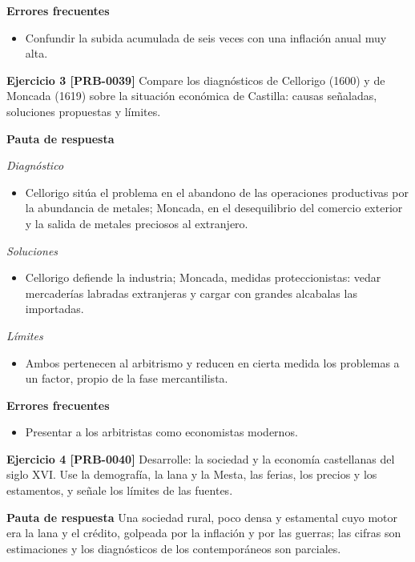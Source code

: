 \documentclass{book}
\begin{document}
\noindent\textbf{Errores frecuentes}
\begin{itemize}
\item Confundir la subida acumulada de seis veces con una inflación anual muy alta.
\end{itemize}

\noindent\textbf{Ejercicio 3 [PRB-0039]}
Compare los diagnósticos de Cellorigo (1600) y de Moncada (1619) sobre la situación económica de Castilla: causas señaladas, soluciones propuestas y límites.


\noindent\textbf{Pauta de respuesta}

\noindent\textit{Diagnóstico}
\begin{itemize}
\item Cellorigo sitúa el problema en el abandono de las operaciones productivas por la abundancia de metales; Moncada, en el desequilibrio del comercio exterior y la salida de metales preciosos al extranjero.
\end{itemize}

\noindent\textit{Soluciones}
\begin{itemize}
\item Cellorigo defiende la industria; Moncada, medidas proteccionistas: vedar mercaderías labradas extranjeras y cargar con grandes alcabalas las importadas.
\end{itemize}

\noindent\textit{Límites}
\begin{itemize}
\item Ambos pertenecen al arbitrismo y reducen en cierta medida los problemas a un factor, propio de la fase mercantilista.
\end{itemize}

\noindent\textbf{Errores frecuentes}
\begin{itemize}
\item Presentar a los arbitristas como economistas modernos.
\end{itemize}

\noindent\textbf{Ejercicio 4 [PRB-0040]}
Desarrolle: la sociedad y la economía castellanas del siglo XVI. Use la demografía, la lana y la Mesta, las ferias, los precios y los estamentos, y señale los límites de las fuentes.


\noindent\textbf{Pauta de respuesta}
Una sociedad rural, poco densa y estamental cuyo motor era la lana y el crédito, golpeada por la inflación y por las guerras; las cifras son estimaciones y los diagnósticos de los contemporáneos son parciales.
\end{document}
